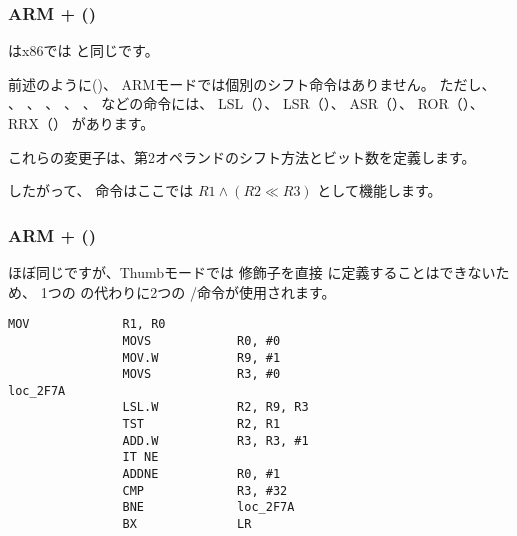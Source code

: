 ﻿\subsubsection{ARM + \OptimizingXcodeIV (\ARMMode)}



\TST はx86では \TEST と同じです。

前述のように()、
ARMモードでは個別のシフト命令はありません。
ただし、 \MOV 、 \TST 、 \CMP 、 \ADD 、 \SUB 、 \RSB などの命令には、
LSL（）、
LSR（）、
ASR（）、
ROR（）、
RRX（） 
があります。

これらの変更子は、第2オペランドのシフト方法とビット数を定義します。

したがって、 命令はここでは $R1 \land (R2 \ll R3)$ として機能します。

\subsubsection{ARM + \OptimizingXcodeIV (\ThumbTwoMode)}

ほぼ同じですが、Thumbモードでは \LSL 修飾子を直接 \TST に定義することはできないため、
1つの \TST の代わりに2つの /\TST 命令が使用されます。

\begin{lstlisting}[label=ARM_leaf_example5,style=customasmARM]
                MOV             R1, R0
                MOVS            R0, #0
                MOV.W           R9, #1
                MOVS            R3, #0
loc_2F7A
                LSL.W           R2, R9, R3
                TST             R2, R1
                ADD.W           R3, R3, #1
                IT NE
                ADDNE           R0, #1
                CMP             R3, #32
                BNE             loc_2F7A
                BX              LR
\end{lstlisting}

